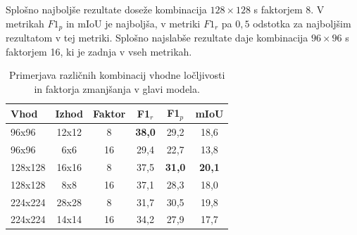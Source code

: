 \documentclass[a4paper,twoside,openright,12pt,slovene]{book}
\begin{document}

            Splošno najboljše rezultate doseže kombinacija $128 \times 128$ s
            faktorjem 8. V metrikah $F1_p$ in mIoU je najboljša, v metriki
            $F1_r$ pa $0{,}5$ odstotka za najboljšim rezultatom v tej metriki.
            Splošno najslabše rezultate daje kombinacija $96 \times 96$ s
            faktorjem 16, ki je zadnja v vseh metrikah.

            \begin{table}[t]
                \centering
                \begin{tabular}{lccccc}
                    \toprule
                    \textbf{Vhod} & \textbf{Izhod} & \textbf{Faktor} & \textbf{F1$_r$} & \textbf{F1$_p$} & \textbf{mIoU} \\
                    \midrule
                    96x96   & 12x12 & 8   &  \textbf{38{,}0} & 29{,}2 & 18{,}6 \\
                    96x96   & 6x6   & 16  &  29{,}4 & 22{,}7 & 13{,}8 \\
                    128x128 & 16x16 & 8   &  37{,}5 & \textbf{31{,}0} & \textbf{20{,}1} \\
                    128x128 & 8x8   & 16  &  37{,}1 & 28{,}3 & 18{,}0 \\
                    224x224 & 28x28 & 8   &  31{,}7 & 30{,}5 & 19{,}8 \\
                    224x224 & 14x14 & 16  &  34{,}2 & 27{,}9 & 17{,}7 \\
                    \bottomrule
                \end{tabular}
                \caption[Primerjava kombinacij vhodne ločljivosti in faktorja zmanjšanja]{Primerjava različnih kombinacij vhodne ločljivosti in faktorja zmanjšanja v glavi modela.}
                \label{tab:res-combos}
            \end{table}
\end{document}
